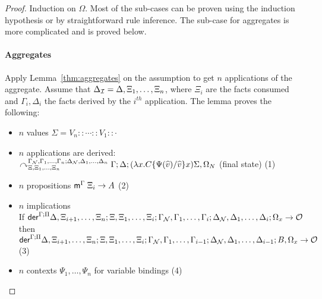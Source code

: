 \begin{proof}\label{sec:derivation_theorem} Induction on $\Omega$. Most of the
sub-cases can be proven using the induction hypothesis or by straightforward
rule inference. The sub-case for aggregates is more
complicated and is proved below.

\paragraph{Aggregates} Apply Lemma~\ref{thm:aggregates} on the assumption to get
$n$ applications of the aggregate. Assume that $\Delta_{\mathcal{I}} = \Delta, \Xi_1,
\dotsc, \Xi_n$, where $\Xi_i$ are the facts consumed and $\Gamma_i, \Delta_i$
the facts derived by the $i^{th}$ application.  The lemma proves the following:

\begin{itemize}[leftmargin=*]
   \item $n$ values $\Sigma = V_n :: \dotsb :: V_1 :: \cdot$
   \item $n$ applications are derived:\\
   $\curvearrowright_{\Xi, \Xi_1, \dotsc, \Xi_n}^{\Gamma_{\mathcal{N}},
      \Gamma_1, \dotsc, \Gamma_n; \Delta_{\mathcal{N}}, \Delta_1, \dotsc,
         \Delta_n} \Gamma; \Delta; (\lambda x.  C\{\Psi(\widehat{v})/\widehat{v}\} x) \Sigma,
            \Omega_N$ (final state) \hfill (1)
   \item $n$ propositions $\mathsf{m}^{\Gamma} \; \Xi_i \rightarrow A$ \hfill (2)
   \item $n$ implications\\
      If $\mathsf{der}^{\Gamma ; \Pi} \Delta, \Xi_{i+1}, \dotsc, \Xi_{n} ; \Xi, \Xi_1,
         \dotsc, \Xi_i; \Gamma_{\mathcal{N}}, \Gamma_1, \dotsc, \Gamma_i; \Delta_{\mathcal{N}},
            \Delta_1, \dotsc, \Delta_i; \Omega_x \rightarrow \mathcal{O}$ then\\
            \hspace*{0.5cm} $\mathsf{der}^{\Gamma ; \Pi} \Delta, \Xi_{i+1}, \dotsc, \Xi_{n} ; \Xi, \Xi_1,
            \dotsc, \Xi_i; \Gamma_{\mathcal{N}}, \Gamma_1, \dotsc, \Gamma_{i-1}; \Delta_{\mathcal{N}},
            \Delta_1, \dotsc, \Delta_{i-1}; B, \Omega_x \rightarrow \mathcal{O}$ \hfill (3)
   \item $n$ contexts $\Psi_1, \dotsc, \Psi_n$ for variable bindings \hfill (4)
\end{itemize}

\newcommand{\outsemm}[3]{#1, \Xi^{*}; #2, \Gamma^{*}; #3, \Delta^{*}}
\newcommand{\aggoutsem}[0]{\outsemm{\Xi, \Xi_1, \dotsc, \Xi_n}{\gammanew, \Gamma_1, \dotsc,
      \Gamma_n}{\deltanew, \Delta_1, \dotsc, \Delta_n}}


\end{proof}
